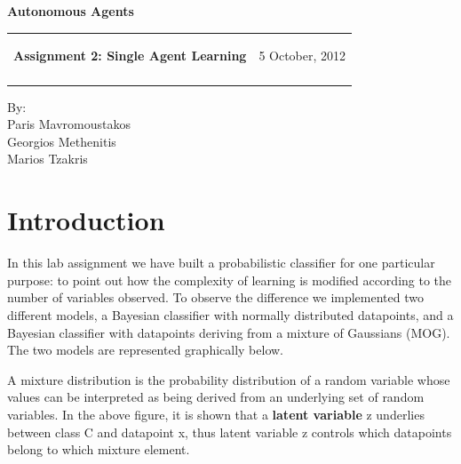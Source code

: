 \documentclass[a4paper,11pt]{article}
\makeatletter
\newcommand{\resheading}[1]{{\large \colorbox{mygrey}{\begin{minipage}{\textwidth}{\textbf{#1 \vphantom{p\^{E}}}}\end{minipage}}}}
\newcommand{\mywebheader}{
  \begin{tabular}{@{}p{5in}p{4in}}
  {\resheading{Assignment 2: Single Agent Learning}} & {\Large 5 October, 2012}\\\vspace{0.2cm}
  \end{tabular}}
\makeatother
\begin{document}
\begin{center}
{\LARGE \textbf{Autonomous Agents}}\\ [1em]
\end{center}
\mywebheader

\begin{center}
{\Large By:} \\ \vspace{0.1cm}
{\Large Paris Mavromoustakos} \\  \vspace{0.1cm}
{\Large Georgios Methenitis} \\ \vspace{0.1cm}
{\Large Marios Tzakris}
\end{center}

\section*{Introduction}
In this lab assignment we have built a probabilistic classifier for one particular purpose: to point out how the complexity of learning is modified according to the number of variables observed. To observe the difference we implemented two different models, a Bayesian classifier with normally distributed datapoints, and a Bayesian classifier with datapoints deriving from a mixture of Gaussians (MOG). The two models are represented graphically below.

\begin{center}
\end{center}


A mixture distribution is the probability distribution of a random variable whose values can be interpreted as being derived from an underlying set of random variables. In the above figure, it is shown that a \textbf{latent variable} z underlies between class C and datapoint x, thus latent variable z controls which datapoints belong to which mixture element.
\end{document}

